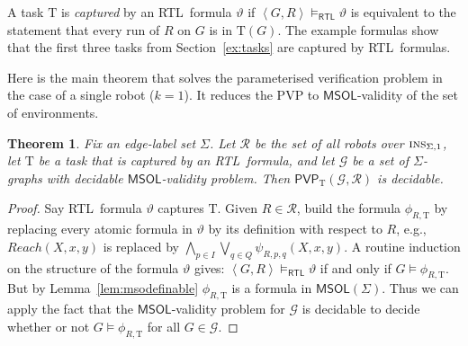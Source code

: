 \documentclass{aamas2015}
\newtheorem{thm}{Theorem}
\def\RTL{\textsf{RTL}}
\def\gclass{\mathcal{G}}
\def\rclass{\mathcal{R}}
\def\T{\mathrm{T}}
\def\PVP{\mathsf{PVP}}
\newcommand{\tpl}[1]{\left<{#1}\right>}
\def\ins{\textsc{ins}}
\def\msol{\mathsf{MSOL}}
\newcommand{\sr}[1]{\footnote{{\color{red} Note. #1}}}
\begin{document}
A task $\T$ is {\em captured} by an \RTL\ formula $\vartheta$ if $\tpl{G,{R}} \models_\RTL \vartheta$ is equivalent to the statement that every run of ${R}$ on $G$ is in $\T(G)$.
The example formulas show that the first three tasks from Section~\ref{ex:tasks} are captured by \RTL\ formulas. 



Here is the main theorem that solves the parameterised verification problem in the case of a single robot ($k=1$). It reduces the PVP to $\msol$-validity of the set of environments.

\begin{thm} \label{thm:PVPdec}
Fix an edge-label set $\Sigma$. Let $\rclass$ be the set of all robots over $\ins_{\Sigma,1}$,  let $\T$ be a task that is captured by an \RTL\ formula, and let $\gclass$ be a set of $\Sigma$-graphs with decidable $\msol$-validity problem. Then $\PVP_\T(\gclass,\rclass)$ is decidable.
\end{thm}
%
\begin{proof}
Say \RTL\ formula $\vartheta$ captures $\T$. Given ${R} \in \rclass$, build the formula $\phi_{{R},\T}$ by replacing every atomic formula in $\vartheta$ by its definition with respect to ${R}$, e.g., $Reach({X},{x},{y})$ is replaced by $\bigwedge_{{p} \in I} \bigvee_{{q} \in Q} \psi_{{R},{p},{q}}({X},{x},{y})$. A routine induction on the structure of the formula $\vartheta$ gives: $\tpl{G,{R}} \models_\RTL \vartheta$ if and only if $G \models \phi_{{R},\T}$. But by Lemma~\ref{lem:msodefinable} $\phi_{{R},\T}$ is a formula in $\msol(\Sigma)$. Thus we can apply the fact that the $\msol$-validity problem for $\gclass$ is decidable to decide whether or not $G \models \phi_{{R},\T}$ for all $G \in \gclass$.
\end{proof}
\end{document}
